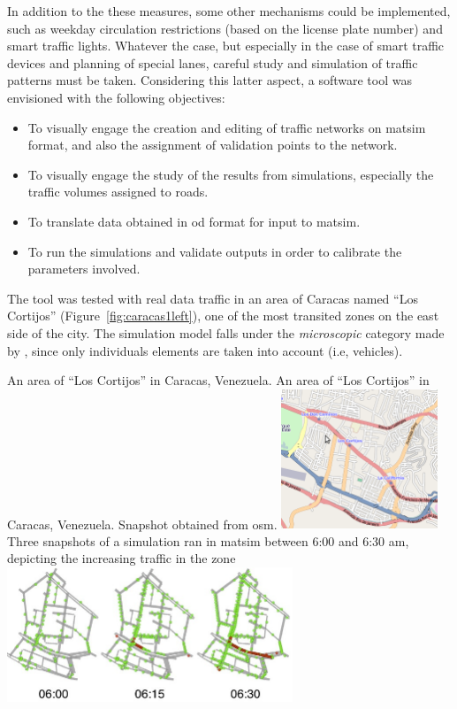 In addition to the these measures, some other mechanisms could be implemented, such as weekday circulation restrictions (\eg based on the license plate number) and smart traffic lights. Whatever the case, but especially in the case of smart traffic devices and planning of special lanes, careful study and simulation of traffic patterns must be taken. Considering this latter aspect, a software tool was envisioned with the following objectives:

\begin{itemize}
 \item To visually engage the creation and editing of traffic networks on \gls{matsim} format, and also the assignment of validation points to the network.

\item To visually engage the study of the results from simulations, especially the traffic volumes assigned to roads.

\item To translate data obtained in \gls{od} format for input to \gls{matsim}.

\item To run the simulations and validate outputs in order to calibrate the parameters involved.
\end{itemize}

The tool was tested with real data traffic in an area of Caracas named ``Los Cortijos'' (Figure~\ref{fig:caracas1left}), one of the most transited zones on the east side of the city. The simulation model falls under the \emph{microscopic} category made by \citet{gartner2001}, since only individuals elements are taken into account (i.e, vehicles).

\createfigure%
{An area of ``Los Cortijos'' in Caracas, Venezuela.}%
{An area of ``Los Cortijos'' in Caracas, Venezuela.}%
{\label{fig:caracas1}}%
{%
 \createsubfigure%
 {Snapshot obtained from \gls{osm}.}
 {\includegraphics[width=0.35\textwidth, angle=0]{./scenarios/figures/caracas0.png}}
 {\label{fig:caracas1left}}
\createsubfigure%
 {Three snapshots of a simulation ran in \gls{matsim} between 6:00 and 6:30 am, depicting the increasing traffic in the zone}
 {\includegraphics[width=0.64\textwidth, angle=0]{./scenarios/figures/caracas1.jpg}}
 {\label{fig:caracas1right}}
}%
{}

